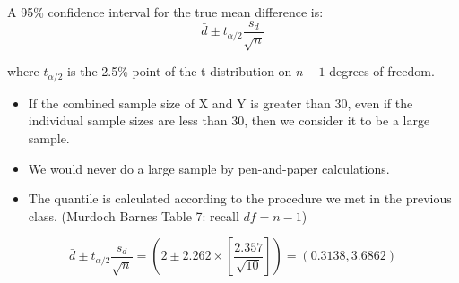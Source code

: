\documentclass[a4paper,12pt]{article}
\begin{document}
A 95\% confidence interval for the true mean difference is:
\[\bar{d} \pm t_{\alpha/2} \frac{s_d}{\sqrt{n}}\]


\noindent where $t_{\alpha/2}$ is the 2.5\% point of the t-distribution on $n-1$ degrees of freedom.

\begin{itemize}
\item If the combined sample size of X and Y is greater than 30, even if the
individual sample sizes are less than 30, then we consider it to be a large
sample.
\item 
We would never do a large sample by pen-and-paper calculations.
\item The quantile is calculated according to the procedure we met in the previous class. (Murdoch Barnes Table 7: recall $df=n-1$)
\end{itemize}
\[\bar{d} \pm t_{\alpha/2} \frac{s_d}{\sqrt{n}} = \left(2 \pm 2.262 \times \left[ \frac{2.357}{\sqrt{10}}\right] \right) = (0.3138,3.6862)\]
\end{document}
